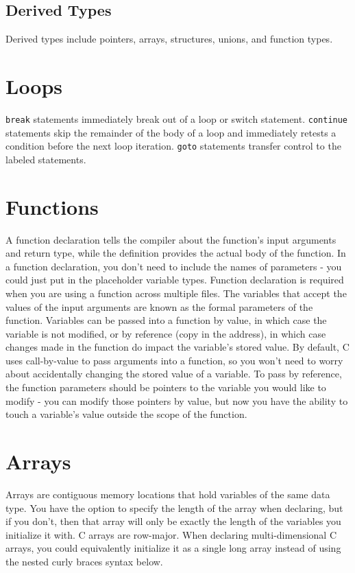\documentclass[10pt]{article}
\begin{document}
\subsection{Derived Types}
Derived types include pointers, arrays, structures, unions, and function types. 

\section{Loops}

{\tt break} statements immediately break out of a loop or switch statement. {\tt continue} statements skip the remainder of the body of a loop and immediately retests a condition before the next loop iteration. {\tt goto} statements transfer control to the labeled statements. 

\section{Functions}

A function declaration tells the compiler about the function's input arguments and return type, while the definition provides the actual body of the function. In a function declaration, you don't need to include the names of parameters - you could just put in the placeholder variable types. Function declaration is required when you are using a function across multiple files. The variables that accept the values of the input arguments are known as the formal parameters of the function. Variables can be passed into a function by value, in which case the variable is not modified, or by reference (copy in the address), in which case changes made in the function do impact the variable's stored value. By default, C uses call-by-value to pass arguments into a function, so you won't need to worry about accidentally changing the stored value of a variable. To pass by reference, the function parameters should be pointers to the variable you would like to modify - you can modify those pointers by value, but now you have the ability to touch a variable's value outside the scope of the function. 

\section{Arrays}
Arrays are contiguous memory locations that hold variables of the same data type. You have the option to specify the length of the array when declaring, but if you don't, then that array will only be exactly the length of the variables you initialize it with. C arrays are row-major. When declaring multi-dimensional C arrays, you could equivalently initialize it as a single long array instead of using the nested curly braces syntax below. 
\end{document}
